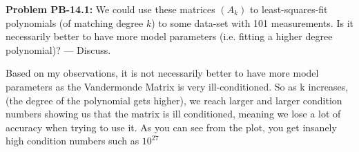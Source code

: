\documentclass[12pt]{article}
\begin{document}
\newpage 

\noindent \textbf{Problem PB-14.1: }We could use these matrices $(A_k)$ to least-squares-fit polynomials (of matching degree $k$) to some data-set with 101 measurements. Is it necessarily better to have more model parameters (i.e. fitting a higher degree polynomial)? — Discuss.

\vspace{\baselineskip}
\noindent Based on my observations, it is not necessarily better to have more model parameters as the Vandermonde Matrix is very ill-conditioned.  So as k increases, (the degree of the polynomial gets higher), we reach larger and larger condition numbers showing us that the matrix is ill conditioned, meaning we lose a lot of accuracy when trying to use it.
As you can see from the plot, you get insanely high condition numbers such as $10^{27}$
\end{document}
